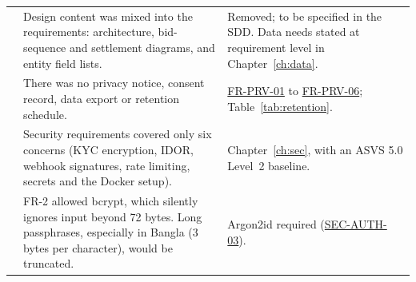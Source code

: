 \documentclass[11pt,a4paper]{report}
\newcommand{\rr}[1]{\hyperlink{#1}{#1}}
\begin{document}
{\begin{longtable}{@{}>{\raggedleft\arraybackslash}p{0.5cm} >{\raggedright\arraybackslash}p{7.3cm} >{\raggedright\arraybackslash}p{6.8cm}@{}}
32 & Design content was mixed into the requirements: architecture, bid-sequence and settlement diagrams, and entity field lists. & Removed; to be specified in the SDD. Data needs stated at requirement level in Chapter~\ref{ch:data}. \\
33 & There was no privacy notice, consent record, data export or retention schedule. & \rr{FR-PRV-01} to \rr{FR-PRV-06}; Table~\ref{tab:retention}. \\
34 & Security requirements covered only six concerns (KYC encryption, IDOR, webhook signatures, rate limiting, secrets and the Docker setup). & Chapter~\ref{ch:sec}, with an ASVS 5.0 Level~2 baseline. \\
35 & FR-2 allowed bcrypt, which silently ignores input beyond 72 bytes. Long passphrases, especially in Bangla (3 bytes per character), would be truncated. & Argon2id required (\rr{SEC-AUTH-03}). \\
\end{longtable}
}
\end{document}
